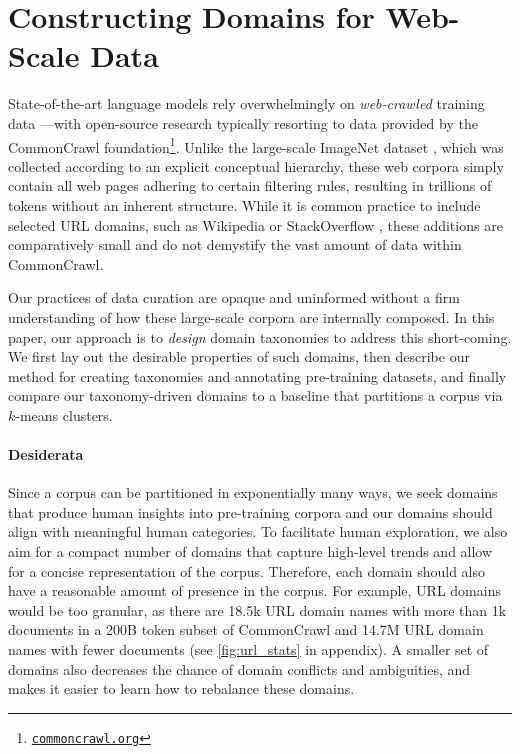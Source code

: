 \section{Constructing Domains for Web-Scale Data} \label{sec:taxonomies}

State-of-the-art language models rely overwhelmingly on \textit{web-crawled} training data \citep{baack2024critical, raffel2020exploring, brown2020language, rae2021scaling, penedo2023refinedweb, soldaini-etal-2024-dolma, penedo2024finewebdatasetsdecantingweb, li2024datacomplm}---with open-source research typically resorting to data provided by the CommonCrawl foundation\footnote{\href{https://commoncrawl.org}{\tt commoncrawl.org}}.
Unlike the large-scale ImageNet dataset \citep{imagenet_cvpr09}, which was collected according to an explicit conceptual hierarchy,
these web corpora simply contain all web pages adhering to certain filtering rules, resulting in trillions of tokens without an inherent structure.
While it is common practice to include selected URL domains, such as Wikipedia or StackOverflow \citep{touvron2023llama, together2023redpajama, soldaini-etal-2024-dolma}, these additions are comparatively small and do not demystify the vast amount of data within CommonCrawl.

Our practices of data curation are opaque and uninformed without a firm understanding of how these large-scale corpora are internally composed.
In this paper, our approach is to {\it design} domain taxonomies to address this short-coming.
We first lay out the desirable properties of such domains, then describe our method for creating taxonomies and annotating pre-training datasets,
and finally compare our taxonomy-driven domains to a baseline that partitions a corpus via $k$-means clusters.




\paragraph{Desiderata}
Since a corpus can be partitioned in exponentially many ways, we seek domains that produce human insights into pre-training corpora and our domains should align with meaningful human categories.
To facilitate human exploration, we also aim for a compact number of domains that capture high-level trends and allow for a concise representation of the corpus. 
Therefore, each domain should also have a reasonable amount of presence in the corpus.
For example, URL domains would be too granular, as there are 18.5k URL domain names with more than 1k documents in a 200B token subset of CommonCrawl and 14.7M URL domain names with fewer documents (see \autoref{fig:url_stats} in appendix). 
A smaller set of domains also decreases the chance of domain conflicts and ambiguities, 
and makes it easier to learn how to rebalance these domains.




